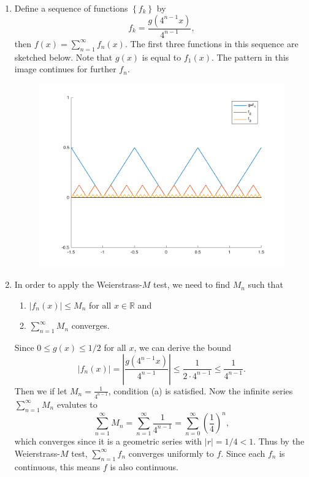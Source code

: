 \documentclass[10pt]{amsart}
\begin{document}
\begin{enumerate}
	\item
		Define a sequence of functions $\left\{ f_k \right\}$ by
		\[
			f_k = \frac{g(4^{n-1}x)}{4^{n-1}} ,
		\] then $f(x) = \sum_{n=1}^{\infty} f_n(x)$. The first three functions in this sequence are sketched below. Note that $g(x)$ is equal to $f_1(x)$. The pattern in this image continues for further $f_n$.
		\begin{figure}[H]
			\centering
			\includegraphics[scale=0.5]{fig/f3.pdf}
		\end{figure}

	\item In order to apply the Weierstrass-$M$ test, we need to find $M_n$ such that
		\begin{enumerate}
			\item $|f_n(x)| \leq M_n$ for all $x \in \mathbb{R}$ and
			\item $\sum_{n=1}^{\infty} M_n$ converges.
		\end{enumerate}
		Since $0 \leq g(x) \leq 1/2$ for all $x$, we can derive the bound
		\[
			|f_n(x)| = \left| \frac{g(4^{n-1}x)}{4^{n-1}}  \right| \leq \frac{1}{2 \cdot 4^{n-1}} \leq \frac{1}{4^{n-1}} .
		\] Then we if let $M_n = \frac{1}{4^{n-1}} $, condition (a) is satisfied. Now the infinite series $\sum_{n=1}^{\infty} M_n$ evalutes to
		\[
			\sum_{n=1}^{\infty} M_n = \sum_{n=1}^{\infty} \frac{1}{4^{n-1}} = \sum_{n=0}^{\infty} \left( \frac{1}{4} \right)^n,
		\] which converges since it is a geometric series with $|r| = 1/4 < 1$. Thus by the Weierstrass-$M$ test, $\sum_{n=1}^{\infty} f_n$ converges uniformly to $f$. Since each $f_n$ is continuous, this means $f$ is also continuous.


\end{enumerate}
\end{document}
